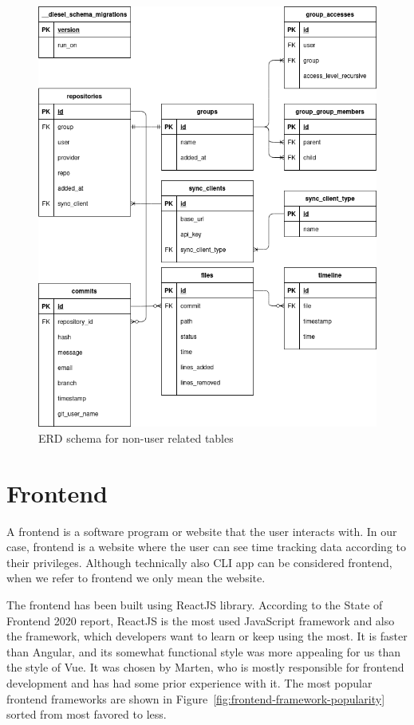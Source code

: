 \begin{figure}[H]
    \includegraphics[width=\textwidth]{figures/erd_schema_general}
    \caption{ERD schema for non-user related tables}
    \label{fig:erd-schema-general}
\end{figure}

\section{Frontend}\label{sec:frontend}
A frontend is a software program or website that the user interacts with.
In our case, frontend is a website where the user can see time tracking data according to their privileges. %
Although technically also CLI app can be considered frontend, when we refer to frontend we only mean the website.

The frontend has been built using ReactJS library.
According to the State of Frontend 2020 report, ReactJS is the most used JavaScript framework and also the framework, which developers want to learn or keep using the most.
It is faster than Angular, and its somewhat functional style was more appealing for us than the style of Vue.
It was chosen by Marten, who is mostly responsible for frontend development and has had some prior experience with it.
The most popular frontend frameworks are shown in Figure~\ref{fig:frontend-framework-popularity} sorted from most favored to less.

